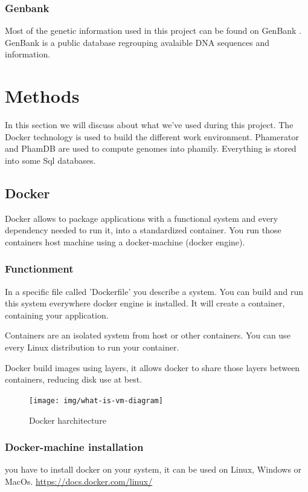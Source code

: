 \documentclass[a4paper,11pt]{report}
\begin{document}
\subsection{Genbank}
\vspace{-0.2cm}
Most of the genetic information used in this project can be found on GenBank \cite{ref10}. GenBank is a public database regrouping avalaible DNA sequences and information.


\chapter{Methods}
In this section we will discuss about what we've used during this project. The Docker technology is used to build the different work environment. Phamerator and PhamDB are used to compute genomes into phamily. Everything is stored into some Sql databases.

\section{Docker}
Docker allows to package applications with a functional system and every dependency needed to run it, into a standardized container. \cite{ref3} You run those containers host machine using a docker-machine (docker engine). 

\subsection{Functionment}
In a specific file called 'Dockerfile' you describe a system. You can build and run this system everywhere docker engine is installed. It will create a container, containing your application.

Containers are an isolated system from host or other containers. You can use every Linux distribution to run your container.

Docker build images using layers, it allows docker to share those layers between containers, reducing disk use at best.

\begin{figure}[H]
	\begin{center}
		\texttt{[image: img/what-is-vm-diagram]}
		\caption{Docker harchitecture}
	\end{center}
\end{figure}
\newpage
\subsection{Docker-machine installation}
you have to install docker on your system, it can be used on Linux, Windows or MacOs. \url{https://docs.docker.com/linux/}
\end{document}

